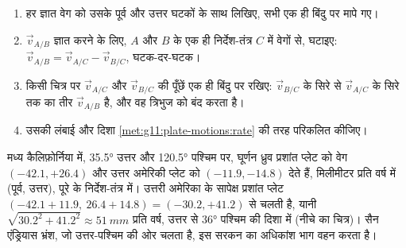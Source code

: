 \begin{method}[वेग-त्रिभुज को बंद करना]\label{met:g11:plate-motions:triangle}
\begin{enumerate}
  \item हर ज्ञात वेग को उसके पूर्व और उत्तर घटकों के साथ लिखिए, सभी
        एक ही बिंदु पर मापे गए।
  \item $\vec v_{A/B}$ ज्ञात करने के लिए, $A$ और $B$ के एक ही
        निर्देश-तंत्र $C$ में वेगों से, घटाइए: $\vec v_{A/B} = \vec v_{A/C} - \vec v_{B/C}$,
        घटक-दर-घटक।
  \item किसी चित्र पर $\vec v_{A/C}$ और $\vec v_{B/C}$ की पूँछें
        एक ही बिंदु पर रखिए: $\vec v_{B/C}$ के सिरे से
        $\vec v_{A/C}$ के सिरे तक का तीर $\vec v_{A/B}$ है, और वह त्रिभुज को बंद करता है।
  \item उसकी लंबाई और दिशा
        \cref{met:g11:plate-motions:rate} की तरह परिकलित कीजिए।
\end{enumerate}
\end{method}

\begin{example}[सैन एंड्रियास भ्रंश]\label{ex:g11:plate-motions:san-andreas}
मध्य कैलिफ़ोर्निया में, \ang{35.5} उत्तर और \ang{120.5} पश्चिम पर, घूर्णन
ध्रुव प्रशांत प्लेट को वेग $(-42.1, +26.4)$ और उत्तर
अमेरिकी प्लेट को $(-11.9, -14.8)$ देते हैं, मिलीमीटर प्रति वर्ष में (पूर्व, उत्तर), पूरे
 के निर्देश-तंत्र में। उत्तरी अमेरिका के सापेक्ष प्रशांत प्लेट
$(-42.1 + 11.9,\ 26.4 + 14.8) = (-30.2, +41.2)$ से चलती है, यानी
$\sqrt{30.2^2 + 41.2^2} \approx \qty{51}{mm}$ प्रति वर्ष, उत्तर से
\ang{36} पश्चिम की दिशा में (नीचे का चित्र)। सैन
एंड्रियास भ्रंश, जो उत्तर-पश्चिम की ओर चलता है, इस सरकन का अधिकांश भाग वहन करता है।
\end{example}

